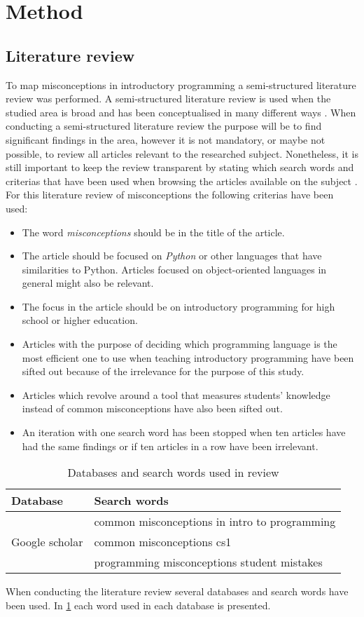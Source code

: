 \section{Method}
\subsection{Literature review}
To map misconceptions in introductory programming a semi-structured 
literature review was performed. A semi-structured literature review is used 
when the studied area is broad and has been conceptualised in many different 
ways \parencite{Snyder2019}. When conducting a semi-structured literature 
review the purpose will be to find significant findings in the area, however 
it is not mandatory, or maybe not possible, to review all articles relevant 
to the researched subject. Nonetheless, it is still important to keep the 
review transparent by stating which search words and criterias that have been 
used when browsing the articles available on the subject 
\parencite{Snyder2019}.
For this literature review of misconceptions the following criterias have 
been used:
\begin{itemize}
\item The word \emph{misconceptions} should be in the title of the article.
\item The article should be focused on \emph{Python} or other languages that 
have similarities to Python. Articles focused on object-oriented languages in 
general might also be relevant.
\item The focus in the article should be on introductory programming for high 
school or higher education.
\item Articles with the purpose of deciding which programming language is the 
most efficient one to use when teaching introductory programming have been 
sifted out because of the irrelevance for the purpose of this study.
\item Articles which revolve around a tool that measures students' knowledge 
instead of common misconceptions have also been sifted out.
\item An iteration with one search word has been stopped when ten articles 
have had the same findings or if ten articles in a row have been irrelevant.
\end{itemize}
\begin{table}[h]
\centering
\begin{tabular}{ll}
\toprule
Database & Search words\\
\midrule
\multirow{3}{4em}{Google scholar} & common misconceptions in intro to 
programming \\
& common misconceptions cs1 \\
& programming misconceptions student mistakes \\
\bottomrule
\end{tabular}
\caption{Databases and search words used in review}
\label{databasesandwords}
\end{table}
When conducting the literature review several databases and search words have 
been used. In \cref{databasesandwords} each word used in each database is 
presented.


